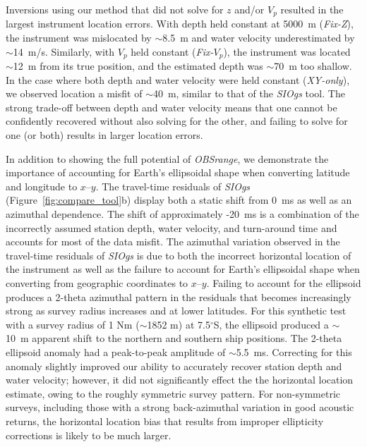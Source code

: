 Inversions using our method that did not solve for $z$ and/or $V_p$ resulted in the largest instrument location errors. With depth held constant at 5000~m (\textit{Fix-Z}), the instrument was mislocated by $\sim$8.5~m and water velocity underestimated by $\sim$14~m/s. Similarly, with $V_p$ held constant (\textit{Fix-$V_p$}), the instrument was located $\sim$12~m from its true position, and the estimated depth was $\sim$70~m too shallow. In the case where both depth and water velocity were held constant (\textit{XY-only}), we observed location a misfit of $\sim$40~m, similar to that of the \textit{SIOgs} tool. The strong trade-off between depth and water velocity means that one cannot be confidently recovered without also solving for the other, and failing to solve for one (or both) results in larger location errors.


In addition to showing the full potential of \textit{OBSrange}, we demonstrate the importance of accounting for Earth's ellipsoidal shape when converting latitude and longitude to $x$--$y$. The travel-time residuals of \textit{SIOgs} (Figure~\ref{fig:compare_tool}b) display both a static shift from 0~ms as well as an azimuthal dependence. The shift of approximately -20~ms is a combination of the incorrectly assumed station depth, water velocity, and turn-around time and accounts for most of the data misfit. The azimuthal variation observed in the travel-time residuals of \textit{SIOgs} is due to both the incorrect horizontal location of the instrument as well as the failure to account for Earth's ellipsoidal shape when converting from geographic coordinates to $x$--$y$. Failing to account for the ellipsoid produces a 2-theta azimuthal pattern in the residuals that becomes increasingly strong as survey radius increases and at lower latitudes. For this synthetic test with a survey radius of 1 Nm ($\sim$1852 m) at 7.5$^{\circ}$S, the ellipsoid produced a $\sim$10~m apparent shift to the northern and southern ship positions. The 2-theta ellipsoid anomaly had a peak-to-peak amplitude of $\sim$5.5~ms. Correcting for this anomaly slightly improved our ability to accurately recover station depth and water velocity; however, it did not significantly effect the the horizontal location estimate, owing to the roughly symmetric survey pattern. For non-symmetric surveys, including those with a strong back-azimuthal variation in good acoustic returns, the horizontal location bias that results from improper ellipticity corrections is likely to be much larger.


